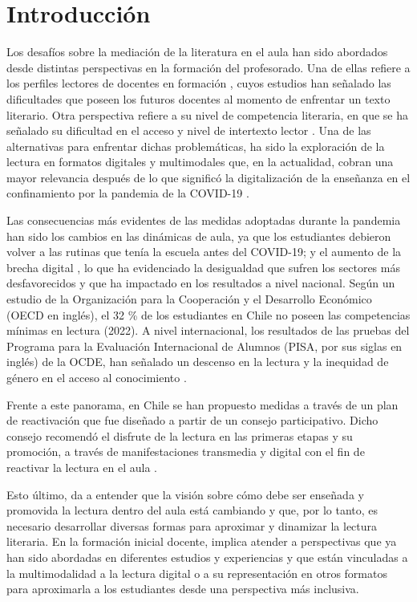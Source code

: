 \section{Introducción} \label{sec-introducción}

Los desafíos sobre la mediación de la literatura en el aula han sido
abordados desde distintas perspectivas en la formación del profesorado.
Una de ellas refiere a los perfiles lectores de docentes en formación
\cite{caride2018leer,colomer2013,granadopuig2014}, cuyos estudios han señalado las dificultades que poseen los
futuros docentes al momento de enfrentar un texto literario. Otra
perspectiva refiere a su nivel de competencia literaria, en que se ha
señalado su dificultad en el acceso y nivel de intertexto lector
\cite{contreras20515}. Una de las alternativas para enfrentar dichas
problemáticas, ha sido la exploración de la lectura en formatos
digitales y multimodales \cite{arbonés2015localización} que, en la
actualidad, cobran una mayor relevancia después de lo que significó la
digitalización de la enseñanza en el confinamiento por la pandemia de la
COVID-19 \cite{ciae_covid19._2020,miras_implications_2023,sanchez-cruzado_teacher_2021}.

Las consecuencias más evidentes de las medidas adoptadas durante la
pandemia han sido los cambios en las dinámicas de aula, ya que los
estudiantes debieron volver a las rutinas que tenía la escuela antes del
COVID-19; y el aumento de la brecha digital \cite{rivera_polo_brecha_2023}, lo que ha
evidenciado la desigualdad que sufren los sectores más desfavorecidos y
que ha impactado en los resultados a nivel nacional. Según un estudio de
la Organización para la Cooperación y el Desarrollo Económico (OECD en
inglés), el 32 \% de los estudiantes en Chile no poseen las competencias
mínimas en lectura (2022). A nivel internacional, los resultados de las
pruebas del Programa para la Evaluación Internacional de Alumnos (PISA,
por sus siglas en inglés) de la OCDE, han señalado un descenso en la
lectura y la inequidad de género en el acceso al conocimiento
\cite{schleicher_2023}.

Frente a este panorama, en Chile se han propuesto medidas a través de un
plan de reactivación que fue diseñado a partir de un consejo
participativo. Dicho consejo recomendó el disfrute de la lectura en las
primeras etapas y su promoción, a través de manifestaciones transmedia y
digital con el fin de reactivar la lectura en el aula \cite{consejopara}.

Esto último, da a entender que la visión sobre cómo debe ser enseñada y
promovida la lectura dentro del aula está cambiando y que, por lo tanto,
es necesario desarrollar diversas formas para aproximar y dinamizar la
lectura literaria. En la formación inicial docente, implica atender a
perspectivas que ya han sido abordadas en diferentes estudios y
experiencias y que están vinculadas a la multimodalidad \cite{reyesTorres_batallerCatalà_2019,berríos2022,farias2019,ow_forster_2012} a la lectura digital \cite{pallares2014,calvovalios2015,ballester2016} o a su representación
en otros formatos para aproximarla a los estudiantes desde una
perspectiva más inclusiva.


